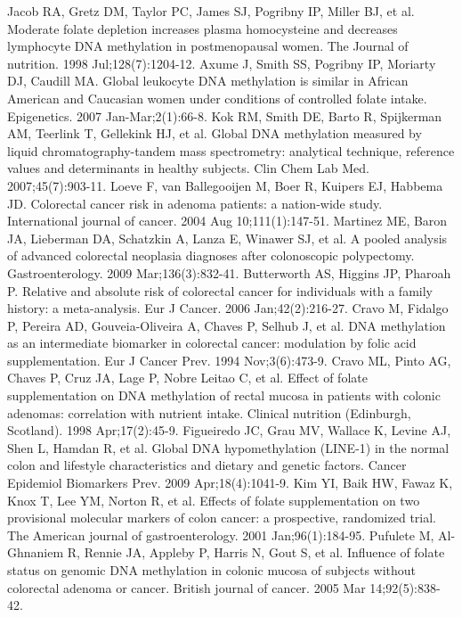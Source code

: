 \begin{thebibliography}{12}
		Jacob RA, Gretz DM, Taylor PC, James SJ, Pogribny IP, Miller BJ, et al. Moderate folate depletion increases plasma homocysteine and decreases lymphocyte DNA methylation in postmenopausal women. The Journal of nutrition. 1998 Jul;128(7):1204-12. 
		Axume J, Smith SS, Pogribny IP, Moriarty DJ, Caudill MA. Global leukocyte DNA methylation is similar in African American and Caucasian women under conditions of controlled folate intake. Epigenetics. 2007 Jan-Mar;2(1):66-8. 
		Kok RM, Smith DE, Barto R, Spijkerman AM, Teerlink T, Gellekink HJ, et al. Global DNA methylation measured by liquid chromatography-tandem mass spectrometry: analytical technique, reference values and determinants in healthy subjects. Clin Chem Lab Med. 2007;45(7):903-11. 
		Loeve F, van Ballegooijen M, Boer R, Kuipers EJ, Habbema JD. Colorectal cancer risk in adenoma patients: a nation-wide study. International journal of cancer. 2004 Aug 10;111(1):147-51. 
		Martinez ME, Baron JA, Lieberman DA, Schatzkin A, Lanza E, Winawer SJ, et al. A pooled analysis of advanced colorectal neoplasia diagnoses after colonoscopic polypectomy. Gastroenterology. 2009 Mar;136(3):832-41. 
		Butterworth AS, Higgins JP, Pharoah P. Relative and absolute risk of colorectal cancer for individuals with a family history: a meta-analysis. Eur J Cancer. 2006 Jan;42(2):216-27. 
		Cravo M, Fidalgo P, Pereira AD, Gouveia-Oliveira A, Chaves P, Selhub J, et al. DNA methylation as an intermediate biomarker in colorectal cancer: modulation by folic acid supplementation. Eur J Cancer Prev. 1994 Nov;3(6):473-9. 
		Cravo ML, Pinto AG, Chaves P, Cruz JA, Lage P, Nobre Leitao C, et al. Effect of folate supplementation on DNA methylation of rectal mucosa in patients with colonic adenomas: correlation with nutrient intake. Clinical nutrition (Edinburgh, Scotland). 1998 Apr;17(2):45-9. 
		Figueiredo JC, Grau MV, Wallace K, Levine AJ, Shen L, Hamdan R, et al. Global DNA hypomethylation (LINE-1) in the normal colon and lifestyle characteristics and dietary and genetic factors. Cancer Epidemiol Biomarkers Prev. 2009 Apr;18(4):1041-9. 
		Kim YI, Baik HW, Fawaz K, Knox T, Lee YM, Norton R, et al. Effects of folate supplementation on two provisional molecular markers of colon cancer: a prospective, randomized trial. The American journal of gastroenterology. 2001 Jan;96(1):184-95. 
		Pufulete M, Al-Ghnaniem R, Rennie JA, Appleby P, Harris N, Gout S, et al. Influence of folate status on genomic DNA methylation in colonic mucosa of subjects without colorectal adenoma or cancer. British journal of cancer. 2005 Mar 14;92(5):838-42. 

\end{thebibliography}
